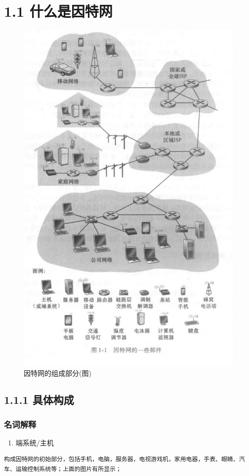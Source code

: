 \documentclass[11pt]{article}
\author{谢树强}
\date{\today}
\title{}
\begin{document}
\tableofcontents

\section{1.1 什么是因特网}
\label{sec:org5f4afdc}

\begin{figure}[htbp]
\centering
\includegraphics[width=.9\linewidth]{imag/Snipaste_2023-11-19_12-29-46.png}
\caption{因特网的组成部分(图)}
\end{figure}

\subsection{1.1.1 具体构成}
\label{sec:orga2e7b74}

\subsubsection{名词解释}
\label{sec:orge867d9b}
\begin{enumerate}
\item 端系统/主机
\end{enumerate}
\begin{verbatim}
构成因特网的初始部分，包括手机，电脑，服务器，电视游戏机，家用电器，手表、眼睛、汽车、运输控制系统等；上面的图片有所显示；
\end{verbatim}
\end{document}

